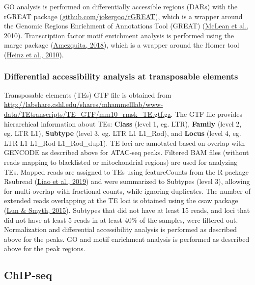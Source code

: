 \documentclass[12pt,twoside]{reedthesis}
\begin{document}
GO analysis is performed on differentially accessible regions (DARs)
with the rGREAT package (\href{https://github.com/jokergoo/rGREAT}{github.com/jokergoo/rGREAT}), which is
a wrapper around the Genomic Regions Enrichment of Annotations Tool
(GREAT) (\protect\hyperlink{ref-mclean2010}{McLean et al., 2010}). Transcription factor motif enrichment analysis is
performed using the marge package (\protect\hyperlink{ref-amezquita2018}{Amezquita, 2018}), which is a wrapper
around the Homer tool (\protect\hyperlink{ref-heinz2010}{Heinz et al., 2010}).

\hypertarget{m3.3.4}{%
\subsubsection*{Differential accessibility analysis at transposable elements}\label{m3.3.4}}

Transposable elements (TEs) GTF file is obtained
from \href{http://labshare.cshl.edu/shares/mhammelllab/www-data/TEtranscripts/TE_GTF/mm10_rmsk_TE.gtf.gz\%20on\%2003.02.2020}{http://labshare.cshl.edu/shares/mhammelllab/www-data/TEtranscripts/TE\_GTF/mm10\_rmsk\_TE.gtf.gz}. The GTF file provides hierarchical information about TEs: \textbf{Class}
(level 1, eg. LTR), \textbf{Family} (level 2, eg. LTR L1), \textbf{Subtype} (level
3, eg. LTR L1 L1\_Rod), and \textbf{Locus} (level 4, eg. LTR L1 L1\_Rod
L1\_Rod\_dup1). TE loci are annotated based on overlap with GENCODE as
described above for ATAC-seq peaks. Filtered BAM files (without reads
mapping to blacklisted or mitochondrial regions) are used for analyzing
TEs. Mapped reads are assigned to TEs using featureCounts from the R
package Rsubread (\protect\hyperlink{ref-liao2019}{Liao et al., 2019}) and were summarized to Subtypes (level 3),
allowing for multi-overlap with fractional counts, while ignoring
duplicates. The number of extended reads overlapping at the TE loci is
obtained using the csaw package (\protect\hyperlink{ref-lun2015}{Lun \& Smyth, 2015}). Subtypes that did not have
at least 15 reads, and loci that did not have at least 5 reads in at
least 40\% of the samples, were filtered out. Normalization and
differential accessibility analysis is performed as described above for
the peaks. GO and motif enrichment analysis is performed as described
above for the peak regions.

\hypertarget{m3.4}{%
\subsection*{ChIP-seq}\label{m3.4}}
\end{document}
